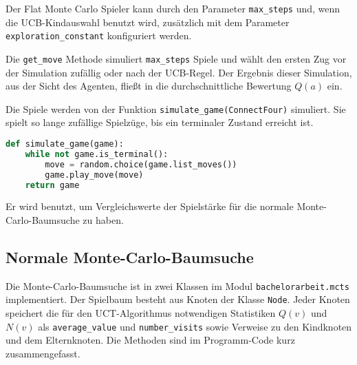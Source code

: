 Der Flat Monte Carlo Spieler kann durch den Parameter \verb|max_steps| und, wenn die UCB-Kindauswahl benutzt wird, zusätzlich mit dem Parameter \verb|exploration_constant| konfiguriert werden.

Die \texttt{get\_move} Methode simuliert \verb|max_steps| Spiele und wählt den ersten Zug vor der Simulation zufällig oder nach der UCB-Regel.
Der Ergebnis dieser Simulation, aus der Sicht des Agenten, fließt in die durchschnittliche Bewertung $Q(a)$ ein.


Die Spiele werden von der Funktion \verb|simulate_game(ConnectFour)| simuliert.
Sie spielt so lange zufällige Spielzüge, bis ein terminaler Zustand erreicht ist.

\begin{lstlisting}[language=Python]
def simulate_game(game):
    while not game.is_terminal():
        move = random.choice(game.list_moves())
        game.play_move(move)
    return game
\end{lstlisting}

Er wird benutzt, um Vergleichswerte der Spielstärke für die normale Monte-Carlo-Baumsuche zu haben.

\subsection{Normale Monte-Carlo-Baumsuche}
\label{subsec:normale-monte-carlo-baumsuche}

Die Monte-Carlo-Baumsuche ist in zwei Klassen im Modul \verb|bachelorarbeit.mcts| implementiert.
Der Spielbaum besteht aus Knoten der Klasse \verb|Node|.
Jeder Knoten speichert die für den UCT-Algorithmus notwendigen Statistiken $Q(v)$ und $N(v)$ als \verb|average_value| und \verb|number_visits| sowie Verweise zu den Kindknoten und dem Elternknoten.
Die Methoden sind im Programm-Code kurz zusammengefasst.

